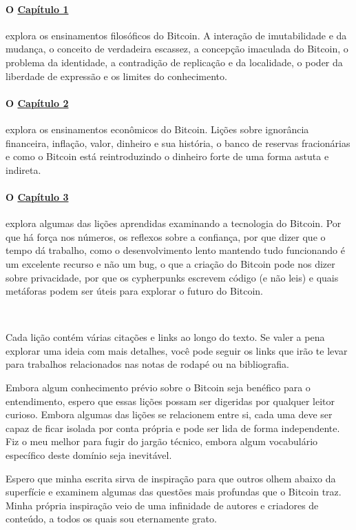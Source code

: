 \paragraph{O \hyperref[ch: philosophy]{Capítulo 1}}{explora os ensinamentos filosóficos do Bitcoin. A interação de imutabilidade e da mudança, o conceito de verdadeira escassez, a concepção imaculada do Bitcoin, o problema da identidade, a contradição de replicação e da localidade, o poder da liberdade de expressão e os limites do conhecimento. }

\paragraph{O \hyperref[ch:economics]{Capítulo 2}}{explora os ensinamentos econômicos do Bitcoin. Lições sobre ignorância financeira, inflação, valor, dinheiro e sua história, o banco de reservas fracionárias e como o Bitcoin está reintroduzindo o dinheiro forte de uma forma astuta e indireta.}

\paragraph{O \hyperref[ch:technology]{Capítulo 3}}{explora algumas das lições aprendidas examinando a tecnologia do Bitcoin. Por que há força nos números, os reflexos sobre a confiança, por que dizer que o tempo dá trabalho, como o desenvolvimento lento mantendo tudo funcionando é um excelente recurso e não um bug, o que a criação do Bitcoin pode nos dizer sobre privacidade, por que os cypherpunks escrevem código (e não leis) e quais metáforas podem ser úteis para explorar o futuro do Bitcoin.}

~

Cada lição contém várias citações e links ao longo do texto. Se valer a pena explorar uma ideia com mais detalhes, você pode seguir os links que irão te levar para trabalhos relacionados nas notas de rodapé ou na bibliografia.

Embora algum conhecimento prévio sobre o Bitcoin seja benéfico para o entendimento, espero que essas lições possam ser digeridas por qualquer leitor curioso. Embora algumas das lições se relacionem entre si, cada uma deve ser capaz de ficar isolada por conta própria e pode ser lida de forma independente. Fiz o meu melhor para fugir do jargão técnico, embora algum vocabulário específico deste domínio seja inevitável.

Espero que minha escrita sirva de inspiração para que outros olhem abaixo da superfície e examinem algumas das questões mais profundas que o Bitcoin traz. Minha própria inspiração veio de uma infinidade de autores e criadores de conteúdo, a todos os quais sou eternamente grato.

